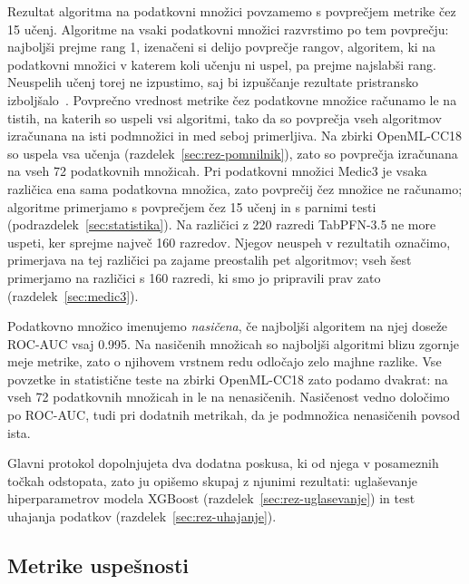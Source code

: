 \documentclass[a4paper,12pt,openright]{book}
\begin{document}
Rezultat algoritma na podatkovni množici povzamemo s povprečjem metrike čez 15
učenj. Algoritme na vsaki podatkovni množici razvrstimo po tem povprečju:
najboljši prejme rang 1, izenačeni si delijo povprečje rangov, algoritem, ki na
podatkovni množici v katerem koli učenju ni uspel, pa prejme najslabši rang.
Neuspelih učenj torej ne izpustimo, saj bi izpuščanje rezultate pristransko
izboljšalo~\cite{wainberg2016random}. Povprečno vrednost metrike čez podatkovne
množice računamo le na tistih, na katerih so uspeli vsi algoritmi, tako da so
povprečja vseh algoritmov izračunana na isti podmnožici in med seboj
primerljiva. Na zbirki OpenML-CC18 so uspela vsa učenja
(razdelek~\ref{sec:rez-pomnilnik}), zato so povprečja izračunana na vseh 72
podatkovnih množicah. Pri podatkovni množici Medic3 je vsaka različica ena sama
podatkovna množica, zato povprečij čez množice ne računamo; algoritme
primerjamo s povprečjem čez 15 učenj in s parnimi testi
(podrazdelek~\ref{sec:statistika}). Na različici z 220 razredi TabPFN-3.5 ne
more uspeti, ker sprejme največ 160 razredov. Njegov neuspeh v rezultatih
označimo, primerjava na tej različici pa zajame preostalih pet algoritmov;
vseh šest primerjamo na različici s 160 razredi, ki smo jo pripravili prav
zato (razdelek~\ref{sec:medic3}).

Podatkovno množico imenujemo \emph{nasičena}, če najboljši algoritem na njej
doseže ROC-AUC vsaj \num{0.995}. Na nasičenih množicah so najboljši algoritmi
blizu zgornje meje metrike, zato o njihovem vrstnem redu odločajo zelo majhne
razlike. Vse povzetke in statistične teste na zbirki OpenML-CC18 zato podamo
dvakrat: na vseh 72 podatkovnih množicah in le na nenasičenih. Nasičenost vedno določimo po ROC-AUC, tudi pri
dodatnih metrikah, da je podmnožica nenasičenih povsod ista.

Glavni protokol dopolnjujeta dva dodatna poskusa, ki od njega v posameznih
točkah odstopata, zato ju opišemo skupaj z njunimi rezultati: uglaševanje
hiperparametrov modela XGBoost (razdelek~\ref{sec:rez-uglasevanje}) in test
uhajanja podatkov (razdelek~\ref{sec:rez-uhajanje}).

\subsection{Metrike uspešnosti}
\label{sec:metrike}
\end{document}

